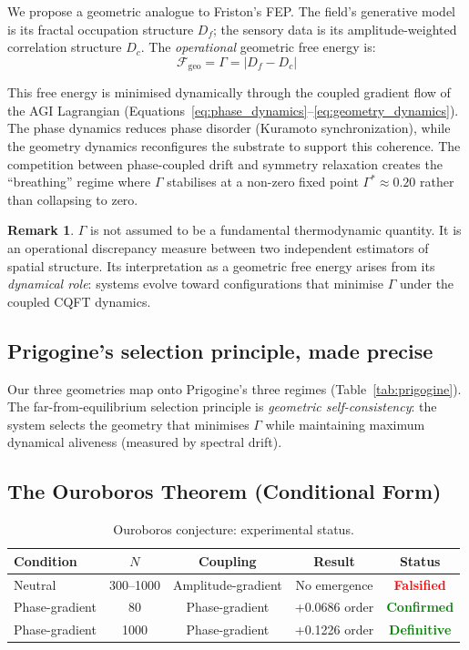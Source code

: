 \documentclass[12pt,a4paper]{article}
\theoremstyle{plain}
\theoremstyle{definition}
\newtheorem{remark}[theorem]{Remark}
\newcommand{\Fc}{\mathcal{F}}
\begin{document}
We propose a geometric analogue to Friston's FEP. The field's generative
model is its fractal occupation structure $D_f$; the sensory data is its
amplitude-weighted correlation structure $D_c$. The \emph{operational}
geometric free energy is:
\begin{equation}
\Fc_{\text{geo}} = \Gamma = |D_f - D_c|
\end{equation}

This free energy is minimised dynamically through the coupled gradient
flow of the AGI Lagrangian
(Equations~\ref{eq:phase_dynamics}--\ref{eq:geometry_dynamics}).
The phase dynamics reduces phase disorder (Kuramoto synchronization),
while the geometry dynamics reconfigures the substrate to support this
coherence. The competition between phase-coupled drift and symmetry
relaxation creates the ``breathing'' regime where $\Gamma$ stabilises
at a non-zero fixed point $\Gamma^* \approx 0.20$ rather than collapsing
to zero.

\begin{remark}
$\Gamma$ is not assumed to be a fundamental thermodynamic quantity. It
is an operational discrepancy measure between two independent estimators
of spatial structure. Its interpretation as a geometric free energy
arises from its \emph{dynamical role}: systems evolve toward
configurations that minimise $\Gamma$ under the coupled CQFT dynamics.
\end{remark}

\subsection{Prigogine's selection principle, made precise}

Our three geometries map onto Prigogine's three regimes
(Table~\ref{tab:prigogine}). The far-from-equilibrium selection principle
is \emph{geometric self-consistency}: the system selects the geometry
that minimises $\Gamma$ while maintaining maximum dynamical aliveness
(measured by spectral drift).

\subsection{The Ouroboros Theorem (Conditional Form)}
\label{sec:ouroboros}

\begin{table}[H]
\centering
\caption{Ouroboros conjecture: experimental status.}
\label{tab:ouroboros_status}
\begin{tabular}{lcccc}
\toprule
\textbf{Condition} & $N$ & \textbf{Coupling} & \textbf{Result} &
  \textbf{Status} \\
\midrule
Neutral & 300--1000 & Amplitude-gradient & No emergence &
  \textcolor{red}{\textbf{Falsified}} \\
Phase-gradient & 80 & Phase-gradient & +0.0686 order &
  \textcolor{green}{\textbf{Confirmed}} \\
Phase-gradient & 1000 & Phase-gradient & +0.1226 order &
  \textcolor{green}{\textbf{Definitive}} \\
\bottomrule
\end{tabular}
\end{table}
\end{document}
